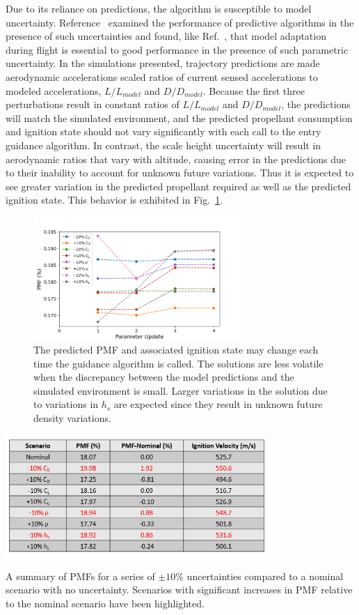Due to its reliance on predictions, the algorithm is susceptible to model uncertainty. Reference~\cite{predictor_corrector_analysis} examined the performance of predictive algorithms in the presence of such uncertainties and found, like Ref.~\cite{lu2014entry}, that model adaptation during flight is essential to good performance in the presence of such parametric uncertainty. In the simulations presented, trajectory predictions are made aerodynamic accelerations scaled ratios of current sensed accelerations to modeled accelerations, $L/L_{model}$ and $ D/D_{model} $. Because the first three perturbations result in constant ratios of $L/L_{model}$ and $ D/D_{model} $, the predictions will match the simulated environment, and the predicted propellant consumption and ignition state should not vary significantly with each call to the entry guidance algorithm. In contrast, the scale height uncertainty will result in aerodynamic ratios that vary with altitude, causing error in the predictions due to their inability to account for unknown future variations. Thus it is expected to see greater variation in the predicted propellant required as well as the predicted ignition state. This behavior is exhibited in Fig.~\ref{fig_parametric_updates}.
\begin{figure}[h!]
	\centering
	\includegraphics[width=0.7\textwidth]{../AAS20/ParameterUpdates} 
	\caption{The predicted PMF and associated ignition state may change each time the guidance algorithm is called. The solutions are less volatile when the discrepancy between the model predictions and the simulated environment is small. Larger variations in the solution due to variations in $h_s$ are expected since they result in unknown future density variations.}
	\label{fig_parametric_updates}
\end{figure}
\begin{table}[h!]
	\centering
	\includegraphics[width=0.75\textwidth]{../AAS20/ParametricSensitivityTable} 
	\caption{A summary of PMFs for a series of $\pm10\%$ uncertainties compared to a nominal scenario with no uncertainty. Scenarios with significant increases in PMF relative to the nominal scenario have been highlighted.}
	\label{table_parametric}
\end{table}

